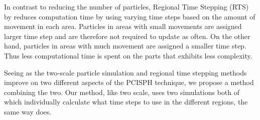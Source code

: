 \documentclass[../../main.tex]{subfiles}
\begin{document}
In contrast to reducing the number of particles, Regional Time Stepping (RTS) by \citet{goswami2014regional} reduces computation time by using varying time steps based on the amount of movement in each area. Particles in areas with small movements are assigned larger time step and are therefore not required to update as often. On the other hand, particles in areas with much movement are assigned a smaller time step. Thus less computational time is spent on the parts that exhibits less complexity.

Seeing as the two-scale particle simulation and regional time stepping methods improve on two different aspects of the PCISPH technique, we propose a method combining the two. Our method, like two scale, uses two simulations both of which individually calculate what time steps to use in the different regions, the same way \citet{goswami2014regional} does. 
\end{document}
